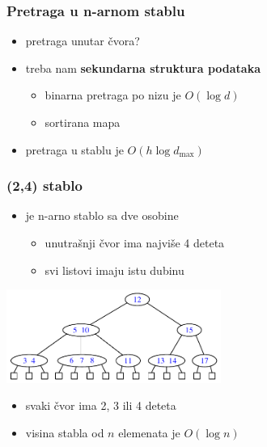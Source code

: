 \documentclass[compress,aspectratio=169]{beamer}
\begin{document}
\begin{frame}[fragile]
  \frametitle{Pretraga u n-arnom stablu}
  \begin{itemize}
    \item pretraga unutar čvora?
    \item treba nam \textbf{sekundarna struktura podataka}
    \begin{itemize}
      \item binarna pretraga po nizu je $O(\log d)$
      \item sortirana mapa
    \end{itemize}
    \item pretraga u stablu je $O(h\log d_{\max})$
  \end{itemize}
\end{frame}

\begin{frame}[fragile]
  \frametitle{(2,4) stablo}
  \begin{itemize}
    \item {} je n-arno stablo sa dve osobine
    \begin{itemize}
      \item unutrašnji čvor ima najviše 4 deteta
      \item svi listovi imaju istu dubinu
    \end{itemize}
  \end{itemize}
  \begin{center}
    \includegraphics[width=7cm]{asp-11-pic30.pdf}
  \end{center}
  \begin{itemize}
    \item svaki čvor ima 2, 3 ili 4 deteta
    \item visina stabla od $n$ elemenata je $O(\log n)$ 
  \end{itemize}
\end{frame}
\end{document}
